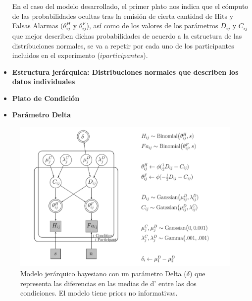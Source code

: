 \begin{itemize}
En el caso del modelo desarrollado, el primer plato nos indica que el cómputo de las probabilidades ocultas tras la emisión de cierta cantidad de Hits y Falsas Alarmas ($\theta^H_{ij}$ y $\theta^F_{ij}$), así como de los valores de los parámetros $D_{ij}$ y $C_{ij}$ que mejor describen dichas probabilidades de acuerdo a la estructura de las distribuciones normales, se va a repetir por cada uno de los participantes incluidos en el experimento ($i participantes$).\\

\item \textbf{Estructura jerárquica: Distribuciones normales que describen los datos individuales}\\




\item \textbf{Plato de Condición}\\



\item \textbf{Parámetro Delta}\\



\end{itemize} 

\begin{figure}[th]
\centering
\includegraphics[width=1.1\textwidth]{Figures/Model_Delta_Diff_D}
\caption[Modelo Delta: Un modelo jerárquico bayesiano para revisar las diferencias en d']{Modelo jerárquico bayesiano con un parámetro Delta ($\delta$) que representa las diferencias en las medias de d' entre las dos condiciones. El modelo tiene priors no informativas.}
\label{fig:Mod_Delta}
\end{figure}





